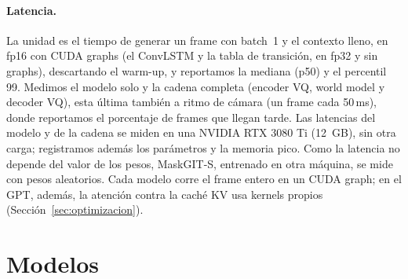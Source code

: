 \documentclass[10pt,twocolumn,a4paper]{article}
\DeclareRobustCommand{\editado}[1]{\textcolor{editado}{#1}}
\DeclareRobustCommand{\editado}[1]{#1}
\newcommand{\ms}{\,ms}
\begin{document}
\paragraph{Latencia.} La unidad es el tiempo de generar un frame con batch~1 y el contexto lleno, en fp16 con CUDA graphs \editado{(el ConvLSTM y la tabla de transición, en fp32 y sin graphs)}, descartando el warm-up, y reportamos la mediana (p50) y el percentil 99. Medimos el modelo solo y la cadena completa (encoder VQ, world model y decoder VQ), esta última también a ritmo de cámara (un frame cada 50\ms), donde reportamos el porcentaje de frames que llegan tarde. \editado{Las latencias del modelo y de la cadena} se miden en una NVIDIA RTX 3080 Ti (12~GB), sin otra carga; registramos además los parámetros y la memoria pico. \editado{Como la latencia no depende del valor de los pesos, MaskGIT-S, entrenado en otra máquina, se mide con pesos aleatorios. Cada modelo corre el frame entero en un CUDA graph; en el GPT, además, la atención contra la caché KV usa kernels propios (Sección~\ref{sec:optimizacion}).}

\section{Modelos}
\label{sec:modelos}

\begin{table}[t]
\centering
\small
{}
\caption{Modelos evaluados. Los modelos latentes (V-JEPA~2, LeWorldModel) se tratan aparte.}
\label{tab:modelos}
\end{table}
\end{document}
